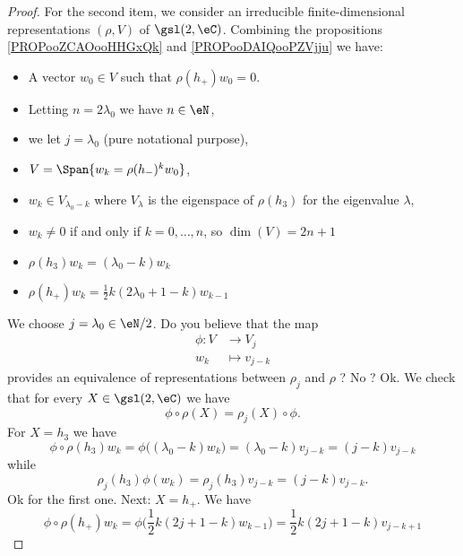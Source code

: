 \begin{proof}
    For the second item, we consider an irreducible finite-dimensional representations \( (\rho,V)\) of \( \gsl(2,\eC)\). Combining the propositions  \ref{PROPooZCAOooHHGxQk} and \ref{PROPooDAIQooPZVjju} we have:
    \begin{itemize}
        \item A vector \( w_0\in V\) such that \( \rho(h_+)w_0=0\).
        \item Letting \( n=2\lambda_0\) we have \( n\in \eN\),
        \item we let \( j=\lambda_0\) (pure notational purpose),
        \item \( V=\Span\{ w_k=\rho(h_-)^kw_0 \}\),
        \item  \( w_k\in V_{\lambda_0-k}\) where \( V_{\lambda}\) is the eigenspace of \( \rho(h_3)\) for the eigenvalue \( \lambda\),
        \item \( w_k\neq 0\) if and only if \( k=0,\ldots, n\), so \( \dim(V)=2n+1\)
        \item \( \rho(h_3)w_k=(\lambda_0-k)w_k\)
        \item \( \rho(h_+)w_k=\frac{ 1 }{2}k(2\lambda_0+1-k)w_{k-1}\)
    \end{itemize}
    We choose \( j=\lambda_0\in \eN/2\). Do you believe that the map
    \begin{equation}
        \begin{aligned}
            \phi\colon V &\to V_j \\
            w_k&\mapsto v_{j-k} 
        \end{aligned}
    \end{equation}
    provides an equivalence of representations between \( \rho_j\) and \( \rho\) ? No ? Ok. We check that for every \( X\in \gsl(2,\eC)\) we have
    \begin{equation}
        \phi\circ\rho(X)=\rho_j(X)\circ \phi.
    \end{equation}
    For \( X=h_3\) we have
    \begin{equation}
        \phi\circ\rho(h_3)w_k=\phi\big( (\lambda_0-k)w_k \big)=(\lambda_0-k)v_{j-k}=(j-k)v_{j-k}
    \end{equation}
    while
    \begin{equation}
        \rho_j(h_3)\phi(w_k)=\rho_j(h_3)v_{j-k}=(j-k)v_{j-k}.
    \end{equation}
    Ok for the first one. Next: \( X=h_+\). We have
    \begin{equation}
        \phi\circ\rho(h_+)w_k=\phi\big( \frac{ 1 }{2}k(2j+1-k)w_{k-1} \big)=\frac{ 1 }{2}k(2j+1-k)v_{j-k+1}

\end{equation}
\end{proof}
